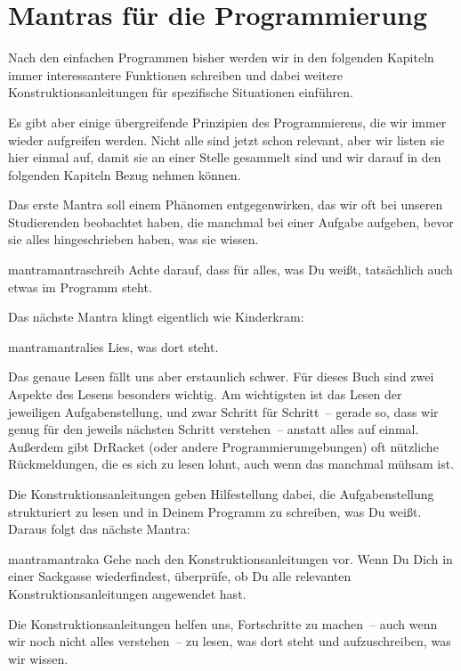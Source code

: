 \section{Mantras für die Programmierung}

Nach den einfachen Programmen bisher werden wir in den
folgenden Kapiteln immer interessantere Funktionen schreiben und dabei
weitere Konstruktionsanleitungen für spezifische Situationen
einführen.

Es gibt aber einige übergreifende Prinzipien des Programmierens, die
wir immer wieder aufgreifen werden.  Nicht alle sind jetzt schon
relevant, aber wir listen sie hier einmal auf, damit sie an einer
Stelle gesammelt sind und wir darauf in den folgenden Kapiteln Bezug
nehmen können.

Das erste Mantra soll einem Phänomen entgegenwirken, das wir oft bei
unseren Studierenden beobachtet haben, die manchmal bei einer Aufgabe
aufgeben, bevor sie alles hingeschrieben haben, was sie wissen.
%
\begin{restatable}{mantra}{mantraschreib}
  \label{mantra:schreib}
  Achte darauf, dass für alles, was Du weißt, tatsächlich auch etwas
  im Programm steht.
\end{restatable}
% 
\noindent Das nächste Mantra klingt eigentlich wie Kinderkram:
%
\begin{restatable}{mantra}{mantralies}
  \label{mantra:lies}
  Lies, was dort steht.
\end{restatable}
% 
\noindent Das genaue Lesen fällt uns aber erstaunlich schwer.  Für dieses Buch
sind zwei Aspekte des Lesens besonders wichtig.  Am wichtigsten ist
das Lesen der jeweiligen Aufgabenstellung, und zwar Schritt für
Schritt~-- gerade so, dass wir genug für den jeweils nächsten Schritt
verstehen~-- anstatt alles auf einmal. Außerdem gibt DrRacket (oder
andere Programmierumgebungen) oft nützliche Rückmeldungen, die es sich
zu lesen lohnt, auch wenn das manchmal mühsam ist.

Die Konstruktionsanleitungen geben Hilfestellung dabei,
die Aufgabenstellung strukturiert zu lesen und in Deinem Programm
zu schreiben, was Du weißt.  Daraus folgt das nächste Mantra:
%
\begin{restatable}{mantra}{mantraka}
  \label{mantra:ka}
  Gehe nach den Konstruktionsanleitungen vor.  Wenn Du Dich in einer
  Sackgasse wiederfindest, überprüfe, ob Du alle relevanten
  Konstruktionsanleitungen angewendet hast.
\end{restatable}
%
\noindent Die Konstruktionsanleitungen helfen uns, Fortschritte zu machen~-- auch
wenn wir noch nicht alles verstehen~-- zu lesen, was dort steht und
aufzuschreiben, was wir wissen.


